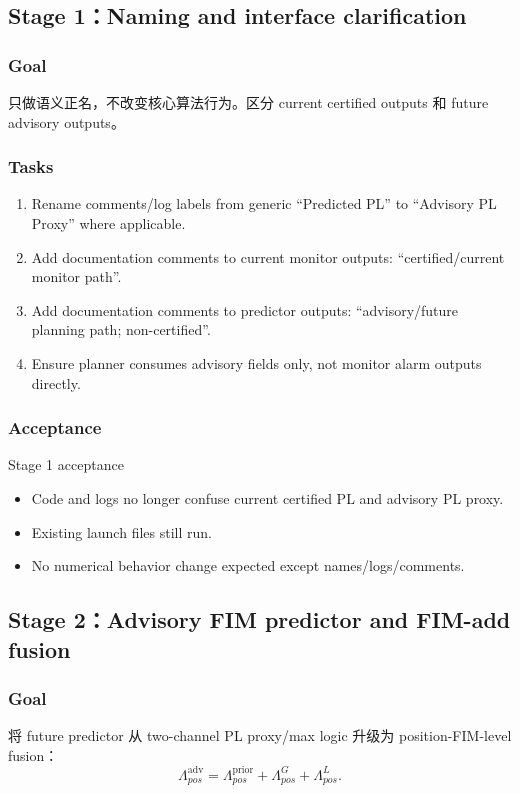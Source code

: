 \documentclass[11pt,a4paper]{article}
\newcommand{\Lam}{\Lambda}
\newcommand{\adv}{\mathrm{adv}}
\newcommand{\prior}{\mathrm{prior}}
\begin{document}
\subsection{Stage 1：Naming and interface clarification}

\subsubsection{Goal}
只做语义正名，不改变核心算法行为。区分 current certified outputs 和 future advisory outputs。

\subsubsection{Tasks}
\begin{enumerate}
\item Rename comments/log labels from generic ``Predicted PL'' to ``Advisory PL Proxy'' where applicable.
\item Add documentation comments to current monitor outputs: ``certified/current monitor path''.
\item Add documentation comments to predictor outputs: ``advisory/future planning path; non-certified''.
\item Ensure planner consumes advisory fields only, not monitor alarm outputs directly.
\end{enumerate}

\subsubsection{Acceptance}
\begin{acceptbox}{Stage 1 acceptance}
\begin{itemize}
  \item Code and logs no longer confuse current certified PL and advisory PL proxy.
  \item Existing launch files still run.
  \item No numerical behavior change expected except names/logs/comments.
\end{itemize}
\end{acceptbox}

\subsection{Stage 2：Advisory FIM predictor and FIM-add fusion}

\subsubsection{Goal}
将 future predictor 从 two-channel PL proxy/max logic 升级为 position-FIM-level fusion：
\[
\Lam^{\adv}_{pos}=\Lam^{\prior}_{pos}+\Lam^G_{pos}+\Lam^L_{pos}.
\]
\end{document}
